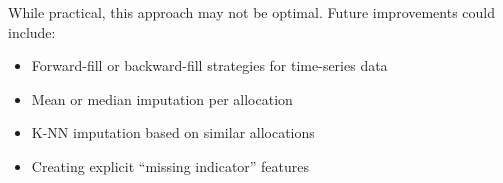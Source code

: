 While practical, this approach may not be optimal. Future improvements could include:
\begin{itemize}
    \item Forward-fill or backward-fill strategies for time-series data
    \item Mean or median imputation per allocation
    \item K-NN imputation based on similar allocations
    \item Creating explicit ``missing indicator'' features
\end{itemize}
